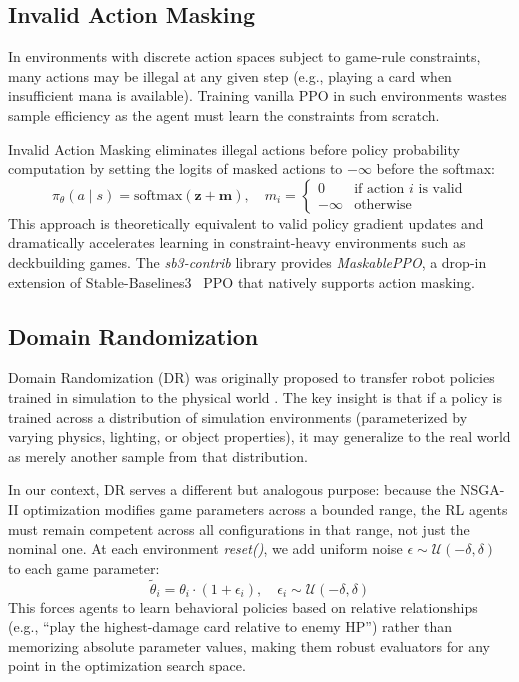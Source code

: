 \subsection{Invalid Action Masking}

In environments with discrete action spaces subject to game-rule constraints, many actions may be illegal at any given step (e.g., playing a card when insufficient mana is available). Training vanilla PPO in such environments wastes sample efficiency as the agent must learn the constraints from scratch.

Invalid Action Masking \cite{huang2020closer} eliminates illegal actions before policy probability computation by setting the logits of masked actions to $-\infty$ before the softmax:
\begin{equation}
\pi_\theta(a \mid s) = \text{softmax}\!\left( \mathbf{z} + \mathbf{m} \right),\quad m_i = \begin{cases} 0 & \text{if action } i \text{ is valid} \\ -\infty & \text{otherwise} \end{cases}
\end{equation}
This approach is theoretically equivalent to valid policy gradient updates \cite{huang2020closer} and dramatically accelerates learning in constraint-heavy environments such as deckbuilding games. The \textit{sb3-contrib} library provides \textit{MaskablePPO}, a drop-in extension of Stable-Baselines3~\cite{raffin2021stable} PPO that natively supports action masking.

\subsection{Domain Randomization}

Domain Randomization (DR) was originally proposed to transfer robot policies trained in simulation to the physical world \cite{tobin2017domain}. The key insight is that if a policy is trained across a distribution of simulation environments (parameterized by varying physics, lighting, or object properties), it may generalize to the real world as merely another sample from that distribution.

In our context, DR serves a different but analogous purpose: because the NSGA-II optimization modifies game parameters across a bounded range, the RL agents must remain competent across all configurations in that range, not just the nominal one. At each environment \textit{reset()}, we add uniform noise $\epsilon \sim \mathcal{U}(-\delta, \delta)$ to each game parameter:
\begin{equation}
\tilde{\theta}_i = \theta_i \cdot (1 + \epsilon_i), \quad \epsilon_i \sim \mathcal{U}(-\delta, \delta)
\end{equation}
This forces agents to learn behavioral policies based on relative relationships (e.g., ``play the highest-damage card relative to enemy HP'') rather than memorizing absolute parameter values, making them robust evaluators for any point in the optimization search space.

